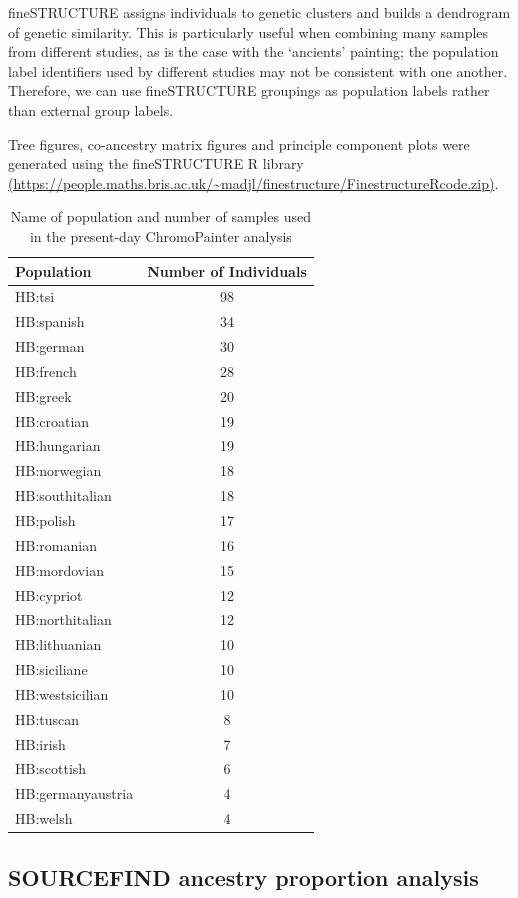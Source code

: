 fineSTRUCTURE assigns individuals to genetic clusters and builds a dendrogram of genetic similarity. This is particularly useful when combining many samples from different studies, as is the case with the `ancients' painting; the population label identifiers used by different studies may not be consistent with one another. Therefore, we can use fineSTRUCTURE groupings as population labels rather than external group labels. 

Tree figures, co-ancestry matrix figures and principle component plots were generated using the fineSTRUCTURE R library \url{(https://people.maths.bris.ac.uk/~madjl/finestructure/FinestructureRcode.zip)}.

\begin{table}
\centering
\begin{tabular}[t]{lc}
\toprule
Population & Number of Individuals\\
\midrule
HB:tsi & 98\\
HB:spanish & 34\\
HB:german & 30\\
HB:french & 28\\
HB:greek & 20\\
HB:croatian & 19\\
HB:hungarian & 19\\
HB:norwegian & 18\\
HB:southitalian & 18\\
HB:polish & 17\\
HB:romanian & 16\\
HB:mordovian & 15\\
HB:cypriot & 12\\
HB:northitalian & 12\\
HB:lithuanian & 10\\
HB:siciliane & 10\\
HB:westsicilian & 10\\
HB:tuscan & 8\\
HB:irish & 7\\
HB:scottish & 6\\
HB:germanyaustria & 4\\
HB:welsh & 4\\
\bottomrule
\end{tabular}
\label{table:present-day_inds_painting}
\caption{Name of population and number of samples used in the present-day ChromoPainter analysis}
\end{table}

\subsection{SOURCEFIND ancestry proportion analysis}

